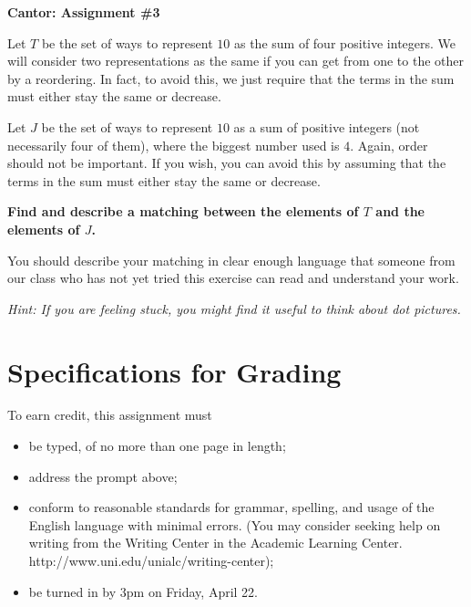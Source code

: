 \documentclass[12pt,letterpaper]{article}
\begin{document}
\setlength{\parskip}{1ex plus 0.5ex minus 0.2ex}
\setlength{\parindent}{0pt}

\pagestyle{fancy}
\lfoot{}
\rfoot{}

\begin{center}
{
\Large
\textbf{Cantor: Assignment \#3}
}
\end{center}

Let $T$ be the set of ways to represent $10$ as the sum of four positive integers.
We will consider two representations as the same if you can get from one to the other by  a reordering.
In fact, to avoid this, we just require that the terms in the sum must either stay the same or decrease.

Let $J$ be the set of ways to represent $10$ as a sum of positive integers (not necessarily four of them), where the biggest number used is $4$.
Again, order should not be important.
If you wish, you can avoid this by assuming that the terms in the sum must either stay the same or decrease.

\textbf{Find and describe a matching between the elements of $T$ and the elements of $J$.}

You should describe your matching in clear enough language that someone from our class who has not yet tried this exercise can read and understand your work.

\vspace{.25in}

\textit{Hint: If you are feeling stuck, you might find it useful to think about dot pictures.}

\section*{Specifications for Grading}

To earn credit, this assignment must
\begin{itemize}
\item be typed, of no more than one page in length;
\item address the prompt above;
\item conform to reasonable standards for grammar, spelling, and usage of the English language with minimal errors. (You may consider seeking help on writing from the Writing Center in the Academic Learning Center. http://www.uni.edu/unialc/writing-center);
\item be turned in by 3pm on Friday, April 22.
\end{itemize}
\end{document}
